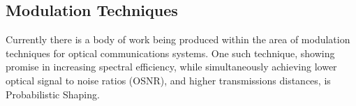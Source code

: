 \subsection{Modulation Techniques}

Currently there is a body of work being produced within the area of modulation
techniques for optical communications systems. One such technique, showing
promise in increasing spectral efficiency\cite{prob_2016}, while simultaneously
achieving lower optical signal to noise ratios (OSNR), and higher transmissions
distances\cite{400Gbps_2019}, is Probabilistic Shaping.
